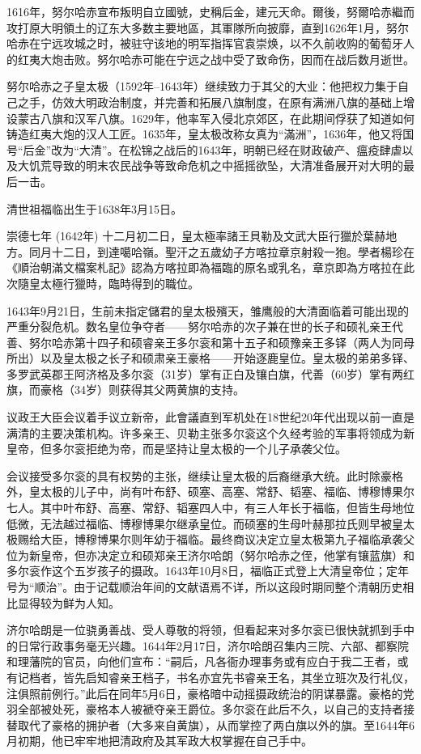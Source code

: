 1616年，努尔哈赤宣布叛明自立國號，史稱后金，建元天命。爾後，努爾哈赤繼而攻打原大明領土的辽东大多数主要地區，其軍隊所向披靡，直到1626年1月，努尔哈赤在宁远攻城之时，被驻守该地的明军指挥官袁崇焕，以不久前收购的葡萄牙人的红夷大炮击败。努尔哈赤可能在宁远之战中受了致命伤，因而在战后数月逝世。

努尔哈赤之子皇太极（1592年–1643年）继续致力于其父的大业：他把权力集于自己之手，仿效大明政治制度，并完善和拓展八旗制度，在原有满洲八旗的基础上增设蒙古八旗和汉军八旗。1629年，他率军入侵北京郊区，在此期间俘获了知道如何铸造红夷大炮的汉人工匠。1635年，皇太极改称女真为“滿洲”，1636年，他又将国号“后金”改为“大清”。在松锦之战后的1643年，明朝已经在财政破产、瘟疫肆虐以及大饥荒导致的明末农民战争等致命危机之中摇摇欲坠，大清准备展开对大明的最后一击。

清世祖福临出生于1638年3月15日。

崇德七年 (1642年) 十二月初二日，皇太極率諸王貝勒及文武大臣行獵於葉赫地方。同月十二日，到達噶哈嶺。聖汗之五歲幼子方喀拉章京射殺一狍。學者楊珍在《順治朝滿文檔案札記》認為方喀拉即為福臨的原名或乳名，章京即為方喀拉在此次隨皇太極行獵時，臨時得到的職位。

1643年9月21日，生前未指定儲君的皇太极殯天，雏鹰般的大清面临着可能出现的严重分裂危机。数名皇位争夺者——努尔哈赤的次子兼在世的长子和硕礼亲王代善、努尔哈赤第十四子和硕睿亲王多尔衮和第十五子和硕豫亲王多铎（两人为同母所出）以及皇太极之长子和硕肃亲王豪格——开始逐鹿皇位。皇太极的弟弟多铎、多罗武英郡王阿济格及多尔衮（31岁）掌有正白及镶白旗，代善（60岁）掌有两红旗，而豪格（34岁）则获得其父两黄旗的支持。

议政王大臣会议着手议立新帝，此會議直到军机处在18世纪20年代出现以前一直是满清的主要决策机构。许多亲王、贝勒主张多尔衮这个久经考验的军事将领成为新皇帝，但多尔衮拒绝为帝，而是坚持让皇太极的一个儿子承袭父位。

会议接受多尔衮的具有权势的主张，继续让皇太极的后裔继承大统。此时除豪格外，皇太极的儿子中，尚有叶布舒、硕塞、高塞、常舒、韬塞、福临、博穆博果尔七人。其中叶布舒、高塞、常舒、韬塞四人中，有三人年长于福临，但皆生母地位低微，无法越过福临、博穆博果尔继承皇位。而硕塞的生母叶赫那拉氏则早被皇太极赐给大臣，博穆博果尔则年幼于福临。最终商议决定立皇太极第九子福临承袭父位为新皇帝，但亦决定立和硕郑亲王济尔哈朗（努尔哈赤之侄，他掌有镶蓝旗）和多尔衮作这个五岁孩子的摄政。1643年10月8日，福临正式登上大清皇帝位；定年号为“顺治”。由于记载顺治年间的文献语焉不详，所以这段时期同整个清朝历史相比显得较为鲜为人知。

济尔哈朗是一位骁勇善战、受人尊敬的将领，但看起来对多尔衮已很快就抓到手中的日常行政事务毫无兴趣。1644年2月17日，济尔哈朗召集内三院、六部、都察院和理藩院的官员，向他们宣布：“嗣后，凡各衙办理事务或有应白于我二王者，或有记档者，皆先启知睿亲王档子，书名亦宜先书睿亲王名，其坐立班次及行礼仪，注俱照前例行。”此后在同年5月6日，豪格暗中动摇摄政统治的阴谋暴露。豪格的党羽全部被处死，豪格本人被褫夺亲王爵位。多尔衮在此后不久，以自己的支持者接替取代了豪格的拥护者（大多来自黄旗），从而掌控了两白旗以外的旗。至1644年6月初期，他已牢牢地把清政府及其军政大权掌握在自己手中。

